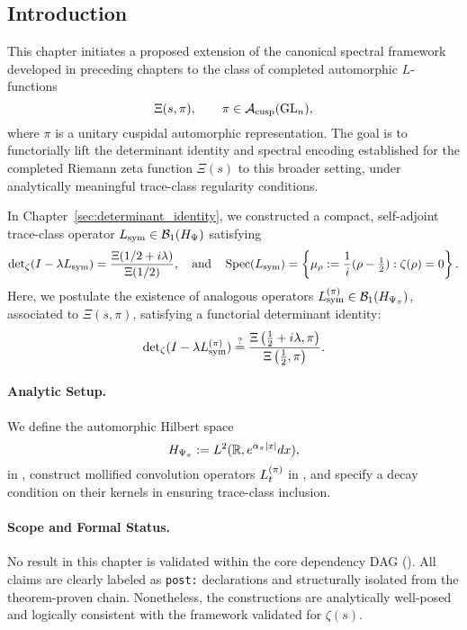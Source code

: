\subsection*{Introduction}
\label{sec:intro_spectral_generalization}

This chapter initiates a proposed extension of the canonical spectral framework developed in preceding chapters to the class of completed automorphic \( L \)-functions
\[
\Xi(s, \pi), \qquad \pi \in \mathcal{A}_{\mathrm{cusp}}(\mathrm{GL}_n),
\]
where \( \pi \) is a unitary cuspidal automorphic representation. The goal is to functorially lift the determinant identity and spectral encoding established for the completed Riemann zeta function \( \Xi(s) \) to this broader setting, under analytically meaningful trace-class regularity conditions.

In Chapter~\ref{sec:determinant_identity}, we constructed a compact, self-adjoint trace-class operator \( L_{\mathrm{sym}} \in \mathcal{B}_1(H_{\Psi}) \) satisfying
\[
\det\nolimits_{\zeta}(I - \lambda L_{\mathrm{sym}}) = \frac{\Xi(1/2 + i\lambda)}{\Xi(1/2)},
\quad \text{and} \quad
\operatorname{Spec}(L_{\mathrm{sym}}) = \left\{ \mu_\rho := \frac{1}{i}(\rho - \tfrac{1}{2}) : \zeta(\rho) = 0 \right\}.
\]
Here, we postulate the existence of analogous operators \( {L_{\mathrm{sym}}^{(\pi)}} \in \mathcal{B}_1(H_{\Psi_{\pi}}) \), associated to \( \Xi(s, \pi) \), satisfying a functorial determinant identity:
\[
\det\nolimits_{\zeta}(I - \lambda {L_{\mathrm{sym}}^{(\pi)}}) \overset{?}{=} \frac{\Xi\left(\tfrac{1}{2} + i\lambda, \pi\right)}{\Xi\left(\tfrac{1}{2}, \pi\right)}.
\]

\paragraph{Analytic Setup.}
We define the automorphic Hilbert space
\[
H_{\Psi_{\pi}} := L^2(\mathbb{R}, e^{\alpha_{\pi} |x|} dx),
\]
in , construct mollified convolution operators \( L_t^{(\pi)} \) in , and specify a decay condition on their kernels in  ensuring trace-class inclusion.

\paragraph{Scope and Formal Status.}
No result in this chapter is validated within the core dependency DAG (). All claims are clearly labeled as \texttt{post:} declarations and structurally isolated from the theorem-proven chain. Nonetheless, the constructions are analytically well-posed and logically consistent with the framework validated for \( \zeta(s) \).

